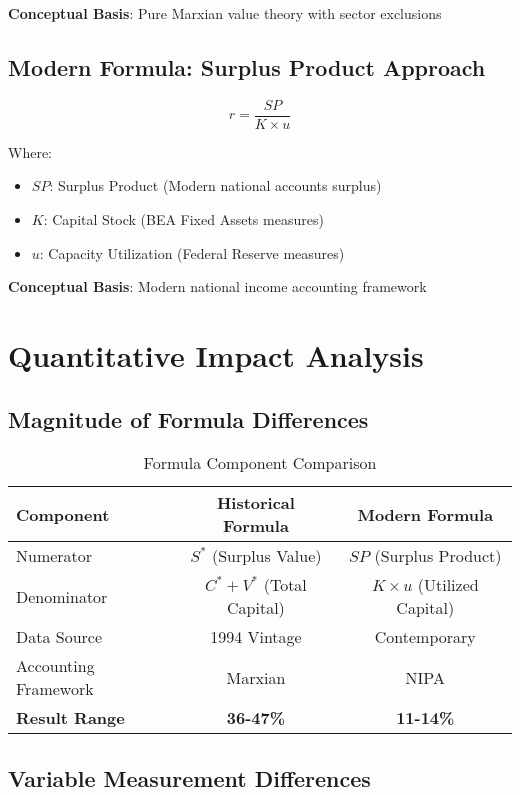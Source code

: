 \documentclass[12pt]{article}
\begin{document}
\textbf{Conceptual Basis}: Pure Marxian value theory with sector exclusions

\subsection{Modern Formula: Surplus Product Approach}

\begin{equation}
r = \frac{SP}{K \times u}
\end{equation}

Where:
\begin{itemize}
    \item $SP$: Surplus Product (Modern national accounts surplus)
    \item $K$: Capital Stock (BEA Fixed Assets measures)
    \item $u$: Capacity Utilization (Federal Reserve measures)
\end{itemize}

\textbf{Conceptual Basis}: Modern national income accounting framework

\section{Quantitative Impact Analysis}

\subsection{Magnitude of Formula Differences}

\begin{table}[h]
\centering
\begin{tabular}{lcc}
\toprule
\textbf{Component} & \textbf{Historical Formula} & \textbf{Modern Formula} \\
\midrule
Numerator & $S^*$ (Surplus Value) & $SP$ (Surplus Product) \\
Denominator & $C^* + V^*$ (Total Capital) & $K \times u$ (Utilized Capital) \\
Data Source & 1994 Vintage & Contemporary \\
Accounting Framework & Marxian & NIPA \\
\textbf{Result Range} & \textbf{36-47\%} & \textbf{11-14\%} \\
\bottomrule
\end{tabular}
\caption{Formula Component Comparison}
\label{tab:formula_comparison}
\end{table}

\subsection{Variable Measurement Differences}
\end{document}

